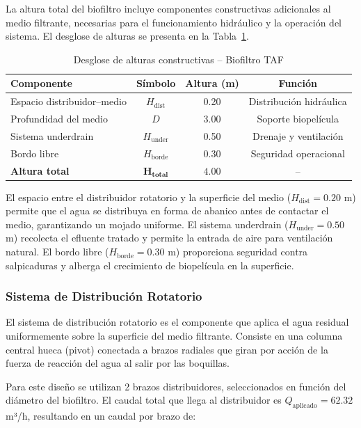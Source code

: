\documentclass[12pt,a4paper]{article}
\begin{document}
La altura total del biofiltro incluye componentes constructivas adicionales al medio filtrante, necesarias para el funcionamiento hidráulico y la operación del sistema. El desglose de alturas se presenta en la Tabla~\ref{tab:alturas_taf}.

\begin{table}[H]
\centering
\caption{Desglose de alturas constructivas -- Biofiltro TAF}
\label{tab:alturas_taf}
\begin{tabular}{lccc}
\toprule
\textbf{Componente} & \textbf{Símbolo} & \textbf{Altura (m)} & \textbf{Función} \\
\midrule
Espacio distribuidor--medio & $H_{\text{dist}}$ & 0.20 & Distribución hidráulica \\
Profundidad del medio & $D$ & 3.00 & Soporte biopelícula \\
Sistema underdrain & $H_{\text{under}}$ & 0.50 & Drenaje y ventilación \\
Bordo libre & $H_{\text{borde}}$ & 0.30 & Seguridad operacional \\
\midrule
\textbf{Altura total} & $\mathbf{H_{\text{total}}}$ & $\mathbf{4.00}$ & -- \\
\bottomrule
\end{tabular}
\end{table}

El espacio entre el distribuidor rotatorio y la superficie del medio ($H_{\text{dist}} = 0.20$ m) permite que el agua se distribuya en forma de abanico antes de contactar el medio, garantizando un mojado uniforme. El sistema underdrain ($H_{\text{under}} = 0.50$ m) recolecta el efluente tratado y permite la entrada de aire para ventilación natural. El bordo libre ($H_{\text{borde}} = 0.30$ m) proporciona seguridad contra salpicaduras y alberga el crecimiento de biopelícula en la superficie.

\subsubsection*{Sistema de Distribución Rotatorio}

El sistema de distribución rotatorio es el componente que aplica el agua residual uniformemente sobre la superficie del medio filtrante. Consiste en una columna central hueca (pivot) conectada a brazos radiales que giran por acción de la fuerza de reacción del agua al salir por las boquillas.

Para este diseño se utilizan 2 brazos distribuidores, seleccionados en función del diámetro del biofiltro. El caudal total que llega al distribuidor es $Q_{\text{aplicado}} = 62.32$ m³/h, resultando en un caudal por brazo de:
\end{document}
